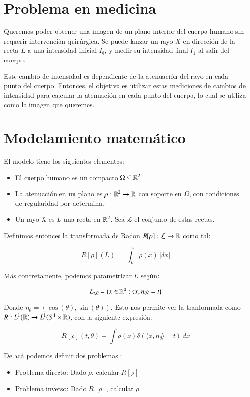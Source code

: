 \section{Problema en medicina}
Queremos poder obtener una imagen de un plano interior del cuerpo humano sin requerir intervención quirúrgica. Se puede lanzar un rayo $X$ en dirección de la recta $L$ a una intensidad inicial $I_0$, y medir su intensidad final $I_1$ al salir del cuerpo. 

Este cambio de intensidad es dependiente de la atenuación del rayo en cada punto del cuerpo. Entonces, el objetivo es utilizar estas mediciones de cambios de intensidad para calcular la atenuación en cada punto del cuerpo, lo cual se utiliza como la imagen que queremos.

\section{Modelamiento matemático}

El modelo tiene los siguientes elementos:
\begin{itemize}
    \item El cuerpo humano es un compacto $\Omega\subseteq \mathbb{R}^2$
    \item La atenuación en un plano es $\rho:\mathbb{R}^2\to\mathbb{R}$ con soporte en $\Omega$, con condiciones de regularidad por determinar
    \item Un rayo X es $L$ una recta en $\mathbb{R}^2$. Sea $\mathcal{L}$ el conjunto de estas rectas.
\end{itemize}

Definimos entonces la transformada de Radon $R[\rho]:\mathcal{L}\to\mathbb{R}$ como tal:

\[
R[\rho](L) := \int_L \rho(x)\,|dx|
\]

Más concretamente, podemos parametrizar $L$ según:

\[
L_{t, \theta} = \{x\in\mathbb{R}^2: \langle x, n_\theta\rangle = t\}
\]

Donde $n_\theta = (\cos(\theta), \sin(\theta))$. Esto nos permite ver la tranformada como $R: L^1(\mathbb{R})\to L^1(S^1\times \mathbb{R})$, con la siguiente expresión:


\[
R[\rho](t, \theta) = \int \rho(x)\delta(\langle x, n_\theta\rangle - t)\, dx
\]


De acá podemos definir dos problemas \citep{kirsch_2022}:
\begin{itemize}
    \item Problema directo: Dado $\rho$, calcular $R[\rho]$
    \item Problema inverso: Dado $R[\rho]$, calcular $\rho$
\end{itemize}

